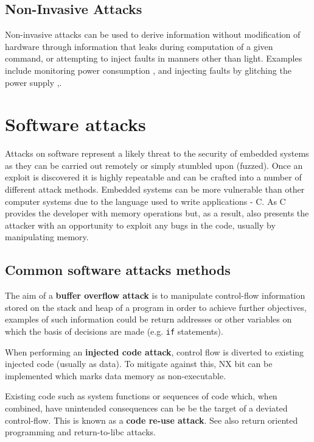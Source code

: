 \subsection{Non-Invasive Attacks}
Non-invasive attacks can be used to derive information without modification of hardware through information that leaks during computation of a given command, or attempting to inject faults in manners other than light. Examples include monitoring power consumption \cite{Maurer1999},\cite{MangardStefan2007Paa:} and injecting faults by glitching the power supply \cite{Anderson1996},\cite{Bar-el2006}.

\section{Software attacks}

Attacks on software represent a likely threat to the security of embedded systems as they can be carried out remotely or simply stumbled upon (fuzzed). Once an exploit is discovered it is highly repeatable and can be crafted into a number of different attack methods. Embedded systems can be more vulnerable than other computer systems due to the language used to write applications - C. As C provides the developer with memory operations but, as a result, also presents the attacker with an opportunity to exploit any bugs in the code, usually by manipulating memory.

\subsection{Common software attacks methods}

The aim of a \textbf{buffer overflow attack} is to manipulate control-flow information stored on the stack and heap of a program in order to achieve further objectives, examples of such information could be return addresses or other variables on which the basis of decisions are made (e.g. \verb|if| statements).

When performing an \textbf{injected code attack}, control flow is diverted to existing injected code (usually as data). To mitigate against this, NX bit can be implemented which marks data memory as non-executable.

Existing code such as system functions or sequences of code which, when combined, have unintended consequences can be be the target of a deviated control-flow. This is known as a \textbf{code re-use attack}. See also return oriented programming and return-to-libc attacks.

